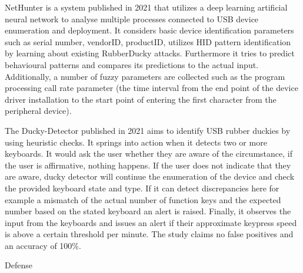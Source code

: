 NetHunter \cite{IntelligentSystemPreventing} is a system published in 2021 that utilizes a deep learning artificial neural network to analyse multiple processes connected to USB device enumeration and deployment. It considers basic device identification parameters such as serial number, vendorID, productID, utilizes HID pattern identification by learning about existing RubberDucky attacks. Furthermore it tries to predict behavioural patterns and compares its predictions to the actual input. Additionally, a number of fuzzy parameters are collected such as the program processing call rate parameter (the time interval from the end point of the device driver installation to the start point of entering the first character from the peripheral device). 

The Ducky-Detector \cite{USBRubberDucky2021} published in 2021 aims to identify USB rubber duckies by using heuristic checks. It springs into action when it detects two or more keyboards. It would ask the user whether they are aware of the circumstance, if the user is affirmative, nothing happens. If the user does not indicate that they are aware, ducky detector will continue the enumeration of the device and check the provided keyboard state and type. If it can detect discrepancies here for example a mismatch of the actual number of function keys and the expected number based on the stated keyboard an alert is raised. Finally, it observes the input from the keyboards and issues an alert if their approximate keypress speed is above a certain threshold per minute. The study claims no false positives and an accuracy of 100\%. 


Defense

